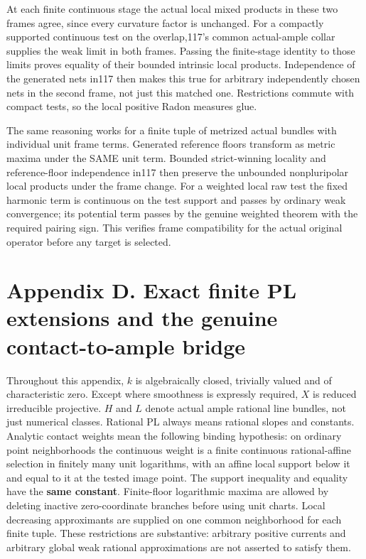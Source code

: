 \documentclass[
  10pt,
]{article}
\begin{document}
At each finite continuous stage the actual local mixed products in these
two frames agree, since every curvature factor is unchanged. For a
compactly supported continuous test on the overlap,117's common
actual-ample collar supplies the weak limit in both frames. Passing the
finite-stage identity to those limits proves equality of their bounded
intrinsic local products. Independence of the generated nets in117 then
makes this true for arbitrary independently chosen nets in the second
frame, not just this matched one. Restrictions commute with compact
tests, so the local positive Radon measures glue.

The same reasoning works for a finite tuple of metrized actual bundles
with individual unit frame terms. Generated reference floors transform
as metric maxima under the SAME unit term. Bounded strict-winning
locality and reference-floor independence in117 then preserve the
unbounded nonpluripolar local products under the frame change. For a
weighted local raw test the fixed harmonic term is continuous on the
test support and passes by ordinary weak convergence; its potential term
passes by the genuine weighted theorem with the required pairing sign.
This verifies frame compatibility for the actual original operator
before any target is selected.

\section{Appendix D. Exact finite PL extensions and the genuine
contact-to-ample
bridge}\label{appendix-d.-exact-finite-pl-extensions-and-the-genuine-contact-to-ample-bridge}

Throughout this appendix, \(k\) is algebraically closed, trivially
valued and of characteristic zero. Except where smoothness is expressly
required, \(X\) is reduced irreducible projective. \(H\) and \(L\)
denote actual ample rational line bundles, not just numerical classes.
Rational PL always means rational slopes and constants. Analytic contact
weights mean the following binding hypothesis: on ordinary point
neighborhoods the continuous weight is a finite continuous
rational-affine selection in finitely many unit logarithms, with an
affine local support below it and equal to it at the tested image point.
The support inequality and equality have the \textbf{same constant}.
Finite-floor logarithmic maxima are allowed by deleting inactive
zero-coordinate branches before using unit charts. Local decreasing
approximants are supplied on one common neighborhood for each finite
tuple. These restrictions are substantive: arbitrary positive currents
and arbitrary global weak rational approximations are not asserted to
satisfy them.
\end{document}
